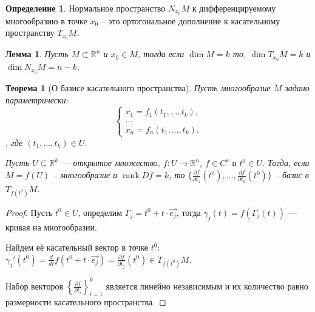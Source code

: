 \documentclass[a5paper]{article}
\newcounter{through}
\theoremstyle{plain}
\newtheorem{theorem}[through]{Теорема}
\newtheorem{lemma}[through]{Лемма}
\theoremstyle{definition}
\newtheorem{definition}[through]{Определение}
\numberwithin{through}{section}
\numberwithin{equation}{section}
\DeclareMathOperator{\rank}{rank}
\begin{document}
\begin{definition}
	Нормальное пространство $N_{x_0}M$ к дифференцируемому многообразию в точке $x_0$ -- это ортогональное дополнение к касательному пространству $T_{x_0}M$.
\end{definition}

\begin{lemma}
	Пусть $M \subset \mathbb{R}^n$ и $x_0 \in M$, тогда если $\dim M = k$ то,
	$\dim T_{x_0}M = k$ и $\dim N_{x_0}M = n - k$.
\end{lemma}

\begin{theorem}[О базисе касательного пространства]
	Пусть многообразие $M$ задано параметрически:
	\begin{equation*}
		\begin{cases}
		x_1 = f_1(t_1,\ldots, t_k), \\
		\ldots \\
		x_n = f_n(t_1,\ldots, t_k).
		\end{cases}
	\end{equation*},
	где $(t_1,\ldots,t_k) \in U$.
	
	Пусть $U \subseteq \mathbb{R}^k$ --- открытое множество, $f : U \to \mathbb{R}^n$, $f \in C^r$ и $t^0 \in U$. Тогда, если $M = f(U)$ -- многообразие и $\rank Df = k$, то $\{\frac{\partial f}{\partial t_1} (t^0), \ldots, \frac{\partial f}{\partial t_k} (t^0) \}$ -- базис в $T_{f(t^0)}M$.
\end{theorem}

\begin{proof}
	Пусть $t^0 \in U$, определим $\Gamma_j = t^0 + t \cdot \vec{e_j}$, тогда 
	$\gamma_j(t)=f(\Gamma_j(t))$ --- кривая на многообразии.
	
	Найдем её касательный вектор в точке $t^0$: $\gamma_j'(t^0) = 
	\frac{d}{dt} f(t^0 + t \cdot \vec{e_j}) = \frac{\partial f}{\partial t_j}(t^0) \in T_{f(t^0)}M$.
	
	Набор векторов $\left\{\frac{\partial f}{\partial t_i}\right\}_{i=1}^{k}$ является линейно независимым и их количество равно размерности касательного пространства.
\end{proof}
\end{document}
